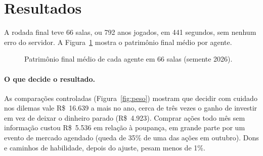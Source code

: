 \documentclass[11pt,a4paper]{article}
\begin{document}
\section{Resultados}
\label{sec:resultados}

A rodada final teve 66 salas, ou 792 anos jogados, em 441 segundos, sem nenhum erro do servidor. A Figura~\ref{fig:ranking} mostra o patrimônio final médio por agente.

\begin{figure}[ht]
  \centering
  \caption{Patrimônio final médio de cada agente em 66 salas (semente 2026).}
  \label{fig:ranking}
\end{figure}

\paragraph{O que decide o resultado.} As comparações controladas (Figura~\ref{fig:peso}) mostram que decidir com cuidado nos dilemas vale R\$~16.639 a mais no ano, cerca de três vezes o ganho de investir em vez de deixar o dinheiro parado (R\$~4.923). Comprar ações todo mês sem informação custou R\$~5.536 em relação à poupança, em grande parte por um evento de mercado agendado (queda de 35\% de uma das ações em outubro). Dons e caminhos de habilidade, depois do ajuste, pesam menos de 1\%.
\end{document}
